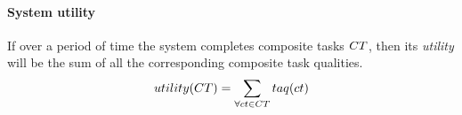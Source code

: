 \paragraph{System utility}
\label{section:utility}
\newcommand{\functionSystemUtility}[2]{\functionSignature{utility}{\setCompositeTask{}{}}}

If over a period of time the system completes composite tasks $\setCompositeTask{}{}$, then its \textit{utility} will be the sum of all the corresponding composite task qualities.
	\begin{equation}
		\label{eq:system_utility}
		\functionSystemUtility{}{} = 
		\sum\limits_{\forall \varCompositeTask{}{} \in \setCompositeTask{}{}}
		\functionCompositeTaskQuality{}{}
	\end{equation}

